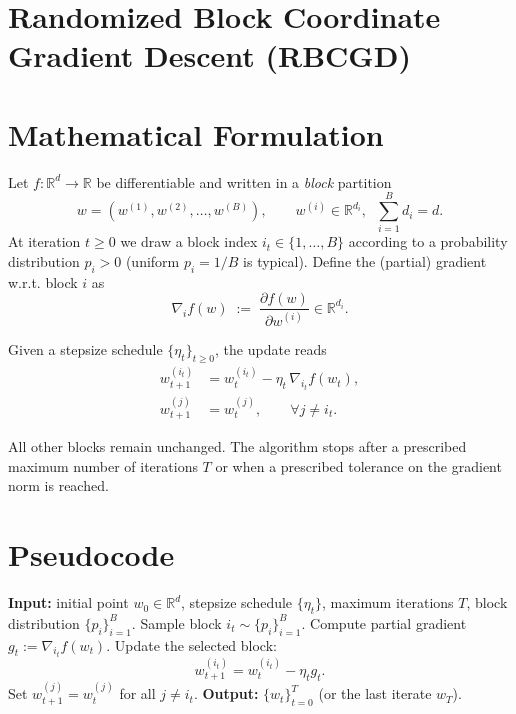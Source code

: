 \documentclass{article}
\newcommand{\R}{\mathbb{R}}
\begin{document}
\section*{Randomized Block Coordinate Gradient Descent (RBCGD)}

\section*{Mathematical Formulation}
Let $f:\R^{d}\rightarrow\R$ be differentiable and written in a \emph{block} partition
\[
w = (w^{(1)},w^{(2)},\dots ,w^{(B)}),\qquad
w^{(i)}\in\R^{d_i},\;\;\sum_{i=1}^{B}d_i=d .
\]
At iteration $t\ge 0$ we draw a block index $i_t\in\{1,\dots ,B\}$ according to a
probability distribution $p_i>0$ (uniform $p_i=1/B$ is typical).  
Define the (partial) gradient w.r.t. block $i$ as
\[
\nabla_i f(w) \;:=\; \frac{\partial f(w)}{\partial w^{(i)}}\in\R^{d_i}.
\]

Given a stepsize schedule $\{\eta_t\}_{t\ge 0}$, the update reads
\[
\boxed{
\begin{aligned}
w^{(i_t)}_{t+1} &= w^{(i_t)}_{t} - \eta_t \,\nabla_{i_t} f(w_t),\\
w^{(j)}_{t+1} &= w^{(j)}_{t},\qquad\forall j\neq i_t .
\end{aligned}}
\tag{1}
\]

All other blocks remain unchanged.  The algorithm stops after a prescribed
maximum number of iterations $T$ or when a prescribed tolerance on the
gradient norm is reached.

\section*{Pseudocode}
\begin{algorithm}[H]
\caption{Randomized Block Coordinate Gradient Descent}
\begin{algorithmic}[1]
\STATE \textbf{Input:} initial point $w_0\in\R^{d}$, stepsize schedule $\{\eta_t\}$, 
maximum iterations $T$, block distribution $\{p_i\}_{i=1}^B$.
    \STATE Sample block $i_t\sim\{p_i\}_{i=1}^B$.
    \STATE Compute partial gradient $g_t:=\nabla_{i_t}f(w_t)$.
    \STATE Update the selected block:
    \[
    w^{(i_t)}_{t+1}= w^{(i_t)}_{t}-\eta_t g_t .
    \]
    \STATE Set $w^{(j)}_{t+1}=w^{(j)}_{t}$ for all $j\neq i_t$.
\ENDFOR
\STATE \textbf{Output:} $\{w_t\}_{t=0}^{T}$ (or the last iterate $w_T$).
\end{algorithmic}
\end{algorithm}
\end{document}
